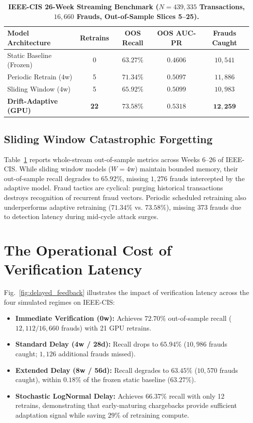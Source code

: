 \documentclass[10pt,conference,compsoc]{IEEEtran}
\begin{document}
\begin{table}[t]
\centering
\caption{\textbf{IEEE-CIS 26-Week Streaming Benchmark ($N=439{,}335$ Transactions, $16{,}660$ Frauds, Out-of-Sample Slices 5--25).}}
\label{tab:ieeecis_streaming}
\small
\begin{tabularx}{0.48\textwidth}{l c c c c}
\toprule
\textbf{Model Architecture} & \textbf{Retrains} & \textbf{OOS Recall} & \textbf{OOS AUC-PR} & \textbf{Frauds Caught} \\
\midrule
Static Baseline (Frozen) & 0 & $63.27\%$ & $0.4606$ & $10{,}541$ \\
Periodic Retrain ($4$w) & 5 & $71.34\%$ & $0.5097$ & $11{,}886$ \\
Sliding Window ($4$w) & 5 & $65.92\%$ & $0.5099$ & $10{,}983$ \\
\textbf{Drift-Adaptive (GPU)} & \textbf{22} & $\mathbf{73.58\%}$ & $\mathbf{0.5318}$ & $\mathbf{12{,}259}$ \\
\bottomrule
\end{tabularx}
\end{table}

\subsection{Sliding Window Catastrophic Forgetting}
Table~\ref{tab:ieeecis_streaming} reports whole-stream out-of-sample metrics across Weeks 6--26 of IEEE-CIS. While sliding window models ($W=4$w) maintain bounded memory, their out-of-sample recall degrades to $65.92\%$, missing $1{,}276$ frauds intercepted by the adaptive model. Fraud tactics are cyclical: purging historical transactions destroys recognition of recurrent fraud vectors. Periodic scheduled retraining also underperforms adaptive retraining ($71.34\%$ vs. $73.58\%$), missing $373$ frauds due to detection latency during mid-cycle attack surges.

\section{The Operational Cost of Verification Latency}
\label{sec:latency_cost}

Fig.~\ref{fig:delayed_feedback} illustrates the impact of verification latency across the four simulated regimes on IEEE-CIS:
\begin{itemize}
    \item \textbf{Immediate Verification (0w):} Achieves $72.70\%$ out-of-sample recall ($12{,}112 / 16{,}660$ frauds) with 21 GPU retrains.
    \item \textbf{Standard Delay (4w / 28d):} Recall drops to $65.94\%$ ($10{,}986$ frauds caught; $1{,}126$ additional frauds missed).
    \item \textbf{Extended Delay (8w / 56d):} Recall degrades to $63.45\%$ ($10{,}570$ frauds caught), within $0.18\%$ of the frozen static baseline ($63.27\%$).
    \item \textbf{Stochastic LogNormal Delay:} Achieves $66.37\%$ recall with only 12 retrains, demonstrating that early-maturing chargebacks provide sufficient adaptation signal while saving $29\%$ of retraining compute.
\end{itemize}
\end{document}
